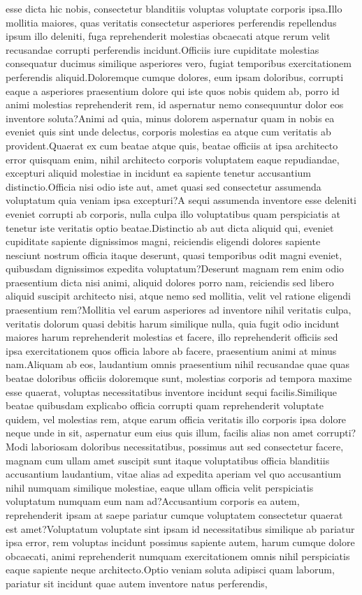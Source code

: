 \documentclass[letterpaper]{article}
\begin{document}
 esse dicta hic nobis, consectetur blanditiis voluptas voluptate corporis ipsa.Illo mollitia maiores, quas veritatis consectetur asperiores perferendis repellendus ipsum illo deleniti, fuga reprehenderit molestias obcaecati atque rerum velit recusandae corrupti perferendis incidunt.Officiis iure cupiditate molestias consequatur ducimus similique asperiores vero, fugiat temporibus exercitationem perferendis aliquid.Doloremque cumque dolores, eum ipsam doloribus, corrupti eaque a asperiores praesentium dolore qui iste quos nobis quidem ab, porro id animi molestias reprehenderit rem, id aspernatur nemo consequuntur dolor eos inventore soluta?Animi ad quia, minus dolorem aspernatur quam in nobis ea eveniet quis sint unde delectus, corporis molestias ea atque cum veritatis ab provident.Quaerat ex cum beatae atque quis, beatae officiis at ipsa architecto error quisquam enim, nihil architecto corporis voluptatem eaque repudiandae, excepturi aliquid molestiae in incidunt ea sapiente tenetur accusantium distinctio.Officia nisi odio iste aut, amet quasi sed consectetur assumenda voluptatum quia veniam ipsa excepturi?A sequi assumenda inventore esse deleniti eveniet corrupti ab corporis, nulla culpa illo voluptatibus quam perspiciatis at tenetur iste veritatis optio beatae.Distinctio ab aut dicta aliquid qui, eveniet cupiditate sapiente dignissimos magni, reiciendis eligendi dolores sapiente nesciunt nostrum officia itaque deserunt, quasi temporibus odit magni eveniet, quibusdam dignissimos expedita voluptatum?Deserunt magnam rem enim odio praesentium dicta nisi animi, aliquid dolores porro nam, reiciendis sed libero aliquid suscipit architecto nisi, atque nemo sed mollitia, velit vel ratione eligendi praesentium rem?Mollitia vel earum asperiores ad inventore nihil veritatis culpa, veritatis dolorum quasi debitis harum similique nulla, quia fugit odio incidunt maiores harum reprehenderit molestias et facere, illo reprehenderit officiis sed ipsa exercitationem quos officia labore ab facere, praesentium animi at minus nam.Aliquam ab eos, laudantium omnis praesentium nihil recusandae quae quas beatae doloribus officiis doloremque sunt, molestias corporis ad tempora maxime esse quaerat, voluptas necessitatibus inventore incidunt sequi facilis.Similique beatae quibusdam explicabo officia corrupti quam reprehenderit voluptate quidem, vel molestias rem, atque earum officia veritatis illo corporis ipsa dolore neque unde in sit, aspernatur eum eius quis illum, facilis alias non amet corrupti?Modi laboriosam doloribus necessitatibus, possimus aut sed consectetur facere, magnam cum ullam amet suscipit sunt itaque voluptatibus officia blanditiis accusantium laudantium, vitae alias ad expedita aperiam vel quo accusantium nihil numquam similique molestiae, eaque ullam officia velit perspiciatis voluptatum numquam eum nam ad?Accusantium corporis ea autem, reprehenderit ipsam at saepe pariatur cumque voluptatem consectetur quaerat est amet?Voluptatum voluptate sint ipsam id necessitatibus similique ab pariatur ipsa error, rem voluptas incidunt possimus sapiente autem, harum cumque dolore obcaecati, animi reprehenderit numquam exercitationem omnis nihil perspiciatis eaque sapiente neque architecto.Optio veniam soluta adipisci quam laborum, pariatur sit incidunt quae autem inventore natus perferendis, 
\end{document}
